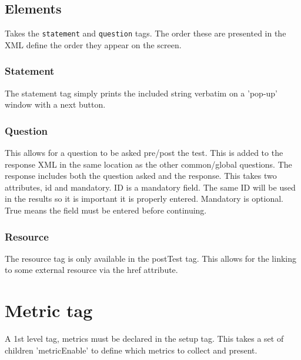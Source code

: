 \documentclass{article}
\begin{document}
\subsection{Elements}
Takes the \texttt{statement} and \texttt{question} tags. The order these are presented in the XML define the order they appear on the screen.

\subsubsection{Statement}

The statement tag simply prints the included string verbatim on a 'pop-up' window with a next button.

\subsubsection{Question}

This allows for a question to be asked pre/post the test. This is added to the response XML in the same location as the other common/global questions. The response includes both the question asked and the response. This takes two attributes, id and mandatory. ID is a mandatory field. The same ID will be used in the results so it is important it is properly entered. Mandatory is optional. True means the field must be entered before continuing.

\subsubsection{Resource}

The resource tag is only available in the postTest tag. This allows for the linking to some external resource via the href attribute.

\section{Metric tag}
A 1st level tag, metrics must be declared in the setup tag. This takes a set of children 'metricEnable' to define which metrics to collect and present.
\end{document}

